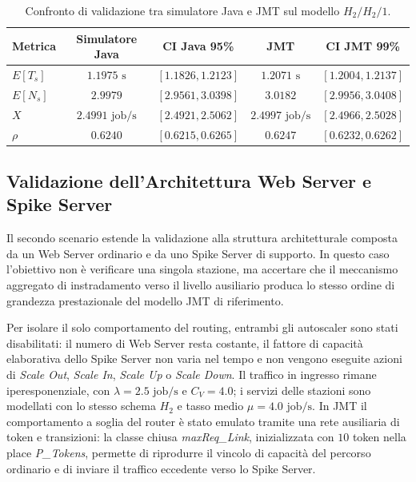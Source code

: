 ﻿\documentclass[a4paper,12pt]{article}
\begin{document}
\begin{table}[htbp]
    \centering
    \small
    \renewcommand{\arraystretch}{1.3}
    \begin{tabular}{lcccc}
        \hline
        \textbf{Metrica} & \textbf{Simulatore Java} & \textbf{CI Java 95\%} & \textbf{JMT} & \textbf{CI JMT 99\%} \\ \hline
        $E[T_s]$         & $1.1975\text{ s}$        & $[1.1826, 1.2123]$    & $1.2071\text{ s}$ & $[1.2004, 1.2137]$ \\
        $E[N_s]$         & $2.9979$                 & $[2.9561, 3.0398]$    & $3.0182$          & $[2.9956, 3.0408]$ \\
        $X$              & $2.4991\text{ job/s}$    & $[2.4921, 2.5062]$    & $2.4997\text{ job/s}$ & $[2.4966, 2.5028]$ \\
        $\rho$           & $0.6240$                 & $[0.6215, 0.6265]$    & $0.6247$          & $[0.6232, 0.6262]$ \\ \hline
    \end{tabular}
    \caption{Confronto di validazione tra simulatore Java e JMT sul modello $H_2/H_2/1$.}
    \label{tab:validation_hyperexp_comparison}
\end{table}

\subsection{Validazione dell'Architettura Web Server e Spike Server}
Il secondo scenario estende la validazione alla struttura architetturale composta da un Web Server ordinario e da uno Spike Server di supporto. In questo caso l'obiettivo non è verificare una singola stazione, ma accertare che il meccanismo aggregato di instradamento verso il livello ausiliario produca lo stesso ordine di grandezza prestazionale del modello JMT di riferimento.

Per isolare il solo comportamento del routing, entrambi gli autoscaler sono stati disabilitati: il numero di Web Server resta costante, il fattore di capacità elaborativa dello Spike Server non varia nel tempo e non vengono eseguite azioni di \textit{Scale Out}, \textit{Scale In}, \textit{Scale Up} o \textit{Scale Down}. Il traffico in ingresso rimane iperesponenziale, con $\lambda = 2.5\text{ job/s}$ e $C_V = 4.0$; i servizi delle stazioni sono modellati con lo stesso schema $H_2$ e tasso medio $\mu = 4.0\text{ job/s}$. In JMT il comportamento a soglia del router è stato emulato tramite una rete ausiliaria di token e transizioni: la classe chiusa \textit{maxReq\_Link}, inizializzata con $10$ token nella place \textit{P\_Tokens}, permette di riprodurre il vincolo di capacità del percorso ordinario e di inviare il traffico eccedente verso lo Spike Server.
\end{document}
